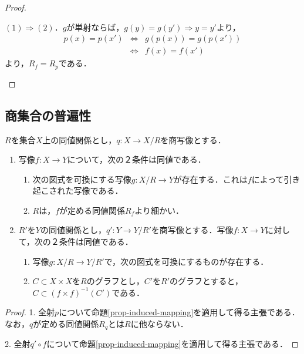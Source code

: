 \documentclass[uplatex,dvipdfmx]{jsreport}
\begin{document}
\begin{proof}
\begin{description}
        $(1)\Rightarrow(2)$．$g$が単射ならば，$g(y)=g(y')\Rightarrow y=y'$より，
        \begin{eqnarray*}
            p(x)=p(x') &\Leftrightarrow& g(p(x))=g(p(x')) \\
            &\Leftrightarrow& f(x)=f(x')
        \end{eqnarray*}
        より，$R_f=R_p$である．
    \end{description}
\end{proof}

\subsection{商集合の普遍性}

\begin{corollary}[商集合の普遍性]
    $R$を集合$X$上の同値関係とし，$q:X\to X/R$を商写像とする．
    \begin{enumerate}
        \item 写像$f:X\to Y$について，次の２条件は同値である．
        \begin{enumerate}[(1)]
            \item 次の図式を可換にする写像$g:X/R\to Y$が存在する．これは$f$によって引き起こされた写像である．\begin{center}\end{center}
            \item $R$は，$f$が定める同値関係$R_f$より細かい．
        \end{enumerate}
        \item $R'$を$Y$の同値関係とし，$q':Y\to Y/R'$を商写像とする．写像$f:X\to Y$に対して，次の２条件は同値である．
        \begin{enumerate}[(1)]
            \item 写像$g:X/R\to Y/R'$で，次の図式を可換にするものが存在する．
            \begin{center}\end{center}
            \item $C\subset X\times X$を$R$のグラフとし，$C'$を$R'$のグラフとすると，$C\subset (f\times f)^{-1}(C')$である．
        \end{enumerate}
    \end{enumerate}
\end{corollary}
\begin{proof}
    1. 全射$p$について命題\ref{prop-induced-mapping}を適用して得る主張である．なお，$q$が定める同値関係$R_q$とは$R$に他ならない．
    
    2. 全射$q'\circ f$について命題\ref{prop-induced-mapping}を適用して得る主張である．
\end{proof}
\end{document}

